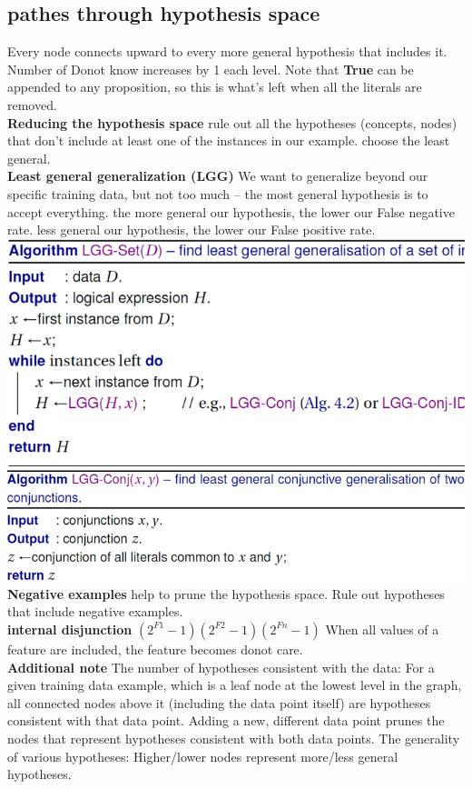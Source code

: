 \documentclass[cheatsheet.tex]{subfiles}
\begin{document}
\subsection{pathes through hypothesis space}
Every node connects upward to every more general hypothesis that includes it. Number of Donot know increases by 1 each level. Note that \textbf{True} can be appended to any proposition, so this is what's left when all the literals are removed.
\\
\textbf{Reducing the hypothesis space} rule out all the hypotheses (concepts, nodes) that don't include at least one of the instances in our example. choose the least general. 
\\
\textbf{Least general generalization (LGG)} We want to generalize beyond our specific training data, but not too much -- the most general hypothesis is to accept everything.  the more general our hypothesis, the lower our False negative rate. less general our hypothesis, the lower our False positive rate. \\
\includegraphics[width=0.8\linewidth]{LGG-set.png}
\includegraphics[width=0.8\linewidth]{LGG-Conj.png}\\
\textbf{Negative examples} help to prune the hypothesis space. Rule out hypotheses that include negative examples. 
\\
\textbf{internal disjunction} $(2^{F1}-1)(2^{F2}-1)(2^{Fn}-1)$ When all values of a feature are included, the feature becomes donot care. 
\\
\textbf{Additional note} \textbullet The number of hypotheses consistent with the data: For a given training data example, which is a leaf node at the lowest level in the graph, all connected nodes above it (including the data point itself) are hypotheses consistent with that data point. Adding a new, different data point prunes the nodes that represent hypotheses consistent with both data points. \textbullet The generality of various hypotheses: Higher/lower nodes represent more/less general hypotheses.
\end{document}
